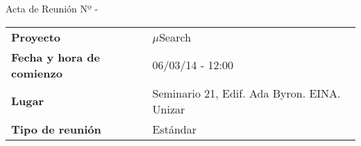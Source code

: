 \begin{center}	
\Large{Acta de Reunión Nº \numeroDeReunion\hspace{0.25em}-\hspace{0.25em}\tituloReunion}
\end{center}
\vspace{1.5em}

\begin{longtable}{ | L{\tabcolsep} |
				     L{\tabcolsep} | }
\hline %
  \\
\hline %
{\bf Proyecto} & $\mu$Search \\ 
\hline %
{\bf Fecha y hora de comienzo} & 06/03/14 - 12:00 \\
\hline %
{\bf Lugar} & Seminario 21, Edif. Ada Byron. EINA. Unizar \\
\hline %
{\bf Tipo de reunión} & Estándar \\
\hline %
\end{longtable}


